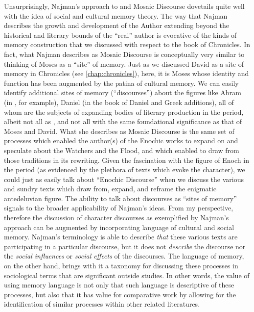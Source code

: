 Unsurprisingly, Najman's approach to \jub and Mosaic Discourse dovetails quite well with the idea of social and cultural memory theory. The way that Najman describes the growth and development of the Author extending beyond the historical and literary bounds of the ``real'' author is evocative of the kinds of memory construction that we discussed with respect to the book of Chronicles. In fact, what Najman describes as Mosaic Discourse is conceptually very similar to thinking of Moses as a ``site'' of memory. Just as we discussed David as a site of memory in Chronicles (see \autoref{chap:chronicles}), here, it is Moses whose identity and function has been augmented by the patina of cultural memory. We can easily identify additional sites of memory (``discourses'') about the figures like Abram (in \ga, for example), Daniel (in the book of Daniel and Greek additions), all of whom are the subjects of expanding bodies of literary production in the \secondtemple period, albeit not all as \psa, and not all with the same foundational significance as that of Moses and David. What she describes as Mosaic Discourse is the same set of processes which enabled the author(s) of the Enochic works to expand on and speculate about the Watchers and the Flood, and which enabled \ga to draw from those traditions in its rewriting. Given the fascination with the figure of Enoch in the \secondtemple period (as evidenced by the plethora of texts which evoke the character), we could just as easily talk about ``Enochic Discourse'' when we discuss the various and sundry texts which draw from, expand, and reframe the enigmatic antedeluvian figure.
The ability to talk about discourses as ``sites of memory'' signals to the broader applicability of Najman's ideas. From my perspective, therefore the discussion of character discourses as exemplified by Najman's approach can be augmented by incorporating language of cultural and social memory. Najman's terminology is able to describe \emph{that} these various texts are participating in a particular discourse, but it does not \emph{describe} the discourse nor the \emph{social influences} or \emph{social effects} of the discourses. The language of memory, on the other hand, brings with it a taxonomy for discussing these processes in sociological terms that are significant outside \secondtemple studies. In other words, the value of using memory language is not only that such language is descriptive of these processes, but also that it has value for comparative work by allowing for the identification of similar processes within other related literatures.

